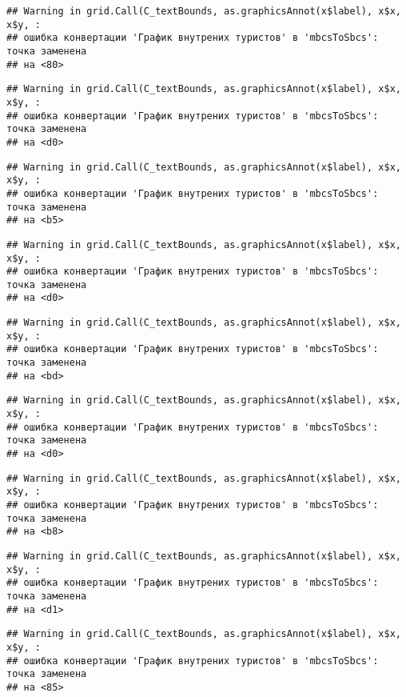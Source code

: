 \documentclass[
]{article}
\begin{document}
\begin{verbatim}
## Warning in grid.Call(C_textBounds, as.graphicsAnnot(x$label), x$x, x$y, :
## ошибка конвертации 'График внутрених туристов' в 'mbcsToSbcs': точка заменена
## на <80>
\end{verbatim}

\begin{verbatim}
## Warning in grid.Call(C_textBounds, as.graphicsAnnot(x$label), x$x, x$y, :
## ошибка конвертации 'График внутрених туристов' в 'mbcsToSbcs': точка заменена
## на <d0>
\end{verbatim}

\begin{verbatim}
## Warning in grid.Call(C_textBounds, as.graphicsAnnot(x$label), x$x, x$y, :
## ошибка конвертации 'График внутрених туристов' в 'mbcsToSbcs': точка заменена
## на <b5>
\end{verbatim}

\begin{verbatim}
## Warning in grid.Call(C_textBounds, as.graphicsAnnot(x$label), x$x, x$y, :
## ошибка конвертации 'График внутрених туристов' в 'mbcsToSbcs': точка заменена
## на <d0>
\end{verbatim}

\begin{verbatim}
## Warning in grid.Call(C_textBounds, as.graphicsAnnot(x$label), x$x, x$y, :
## ошибка конвертации 'График внутрених туристов' в 'mbcsToSbcs': точка заменена
## на <bd>
\end{verbatim}

\begin{verbatim}
## Warning in grid.Call(C_textBounds, as.graphicsAnnot(x$label), x$x, x$y, :
## ошибка конвертации 'График внутрених туристов' в 'mbcsToSbcs': точка заменена
## на <d0>
\end{verbatim}

\begin{verbatim}
## Warning in grid.Call(C_textBounds, as.graphicsAnnot(x$label), x$x, x$y, :
## ошибка конвертации 'График внутрених туристов' в 'mbcsToSbcs': точка заменена
## на <b8>
\end{verbatim}

\begin{verbatim}
## Warning in grid.Call(C_textBounds, as.graphicsAnnot(x$label), x$x, x$y, :
## ошибка конвертации 'График внутрених туристов' в 'mbcsToSbcs': точка заменена
## на <d1>
\end{verbatim}

\begin{verbatim}
## Warning in grid.Call(C_textBounds, as.graphicsAnnot(x$label), x$x, x$y, :
## ошибка конвертации 'График внутрених туристов' в 'mbcsToSbcs': точка заменена
## на <85>
\end{verbatim}
\end{document}
